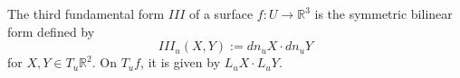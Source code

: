 The third fundamental form $III$ of a surface $f: U \to \mathbb{R}^3$ is the symmetric bilinear form defined by
$$III_u(X, Y) := dn_u X \cdot dn_u Y$$
for $X, Y \in T_u\mathbb{R}^2$. On $T_u f$, it is given by $L_u X \cdot L_u Y$.